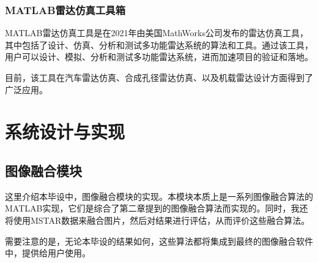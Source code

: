 \documentclass{xduugthesis}
\begin{document}
\subsection{MATLAB雷达仿真工具箱}
MATLAB雷达仿真工具是在2021年由美国MathWorks公司发布的雷达仿真工具，其中包括了设计、仿真、分析和测试多功能雷达系统的算法和工具。通过该工具，用户可以设计、模拟、分析和测试多功能雷达系统，进而加速项目的验证和落地。\par
目前，该工具在汽车雷达仿真、合成孔径雷达仿真、以及机载雷达设计方面得到了广泛应用。
\chapter{系统设计与实现}
\section{图像融合模块}
这里介绍本毕设中，图像融合模块的实现。本模块本质上是一系列图像融合算法的MATLAB实现，它们是综合了第二章提到的图像融合算法而实现的。同时，我还将使用MSTAR数据来融合图片，然后对结果进行评估，从而评价这些融合算法。\par
需要注意的是，无论本毕设的结果如何，这些算法都将集成到最终的图像融合软件中，提供给用户使用。
\end{document}
